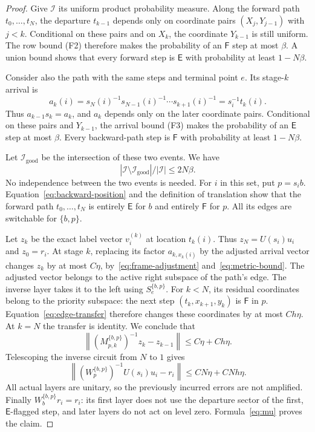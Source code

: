 \documentclass[11pt]{article}
\numberwithin{equation}{section}
\theoremstyle{definition}
\theoremstyle{remark}
\newcommand{\norm}[1]{\left\lVert#1\right\rVert}
\newcommand{\abs}[1]{\left\lvert#1\right\rvert}
\newcommand{\E}{\mathsf E}
\newcommand{\F}{\mathsf F}
\newcommand{\cI}{\mathcal I}
\begin{document}
\begin{proof}
Give $\cI$ its uniform product probability measure. Along the forward
path $t_0,\ldots,t_N$, the departure $t_{k-1}$ depends only on coordinate
pairs $(X_j,Y_{j-1})$ with $j<k$. Conditional on these pairs and on $X_k$,
the coordinate $Y_{k-1}$ is still uniform. The row bound (F2) therefore
makes the probability of an $\F$ step at most $\beta$. A union bound shows
that every forward step is $\E$ with probability at least $1-N\beta$.

Consider also the path with the same steps and terminal point $e$. Its
stage-$k$ arrival is
\begin{equation}\label{eq:backward-position}
 a_k(i)=s_N(i)^{-1}s_{N-1}(i)^{-1}\cdots s_{k+1}(i)^{-1}
       =s_i^{-1}t_k(i).
\end{equation}
Thus $a_{k-1}s_k=a_k$, and $a_k$ depends only on the later coordinate pairs.
Conditional on these pairs and $Y_{k-1}$, the arrival bound (F3) makes the
probability of an $\E$ step at most $\beta$. Every backward-path step is
$\F$ with probability at least $1-N\beta$.

Let $\cI_{\mathrm{good}}$ be the intersection of these two events. We have
\begin{equation}\label{eq:good-fraction}
 \abs{\cI\setminus\cI_{\mathrm{good}}}/\abs{\cI}\le2N\beta.
\end{equation}
No independence between the two events is needed. For $i$ in this set,
put $p=s_i b$. Equation~\eqref{eq:backward-position} and the definition
of translation show that the forward path $t_0,\ldots,t_N$ is entirely
$\E$ for $b$ and entirely $\F$ for $p$. All its edges are switchable for
$\{b,p\}$.

Let $z_k$ be the exact label vector $v_i^{(k)}$ at location $t_k(i)$.
Thus $z_N=U(s_i)u_i$ and $z_0=r_i$. At stage $k$, replacing its factor
$a_{k,x_k(i)}$ by the adjusted arrival vector changes $z_k$ by at most
$C\eta$, by~\eqref{eq:frame-adjustment} and~\eqref{eq:metric-bound}.
The adjusted vector belongs to the active right subspace of the path's
edge. The inverse layer takes it to the left using $S_e^{\{b,p\}}$.
For $k<N$, its residual coordinates belong to the priority subspace:
the next step $(t_k,x_{k+1},y_k)$ is $\F$ in $p$.
Equation~\eqref{eq:edge-transfer} therefore changes these coordinates by
at most $Ch\eta$. At $k=N$ the transfer is identity. We conclude that
\[
 \norm{(M_{p,k}^{\{b,p\}})^{-1}z_k-z_{k-1}}
 \le C\eta+Ch\eta.
\]
Telescoping the inverse circuit from $N$ to $1$ gives
\[
 \norm{(W_p^{\{b,p\}})^{-1}U(s_i)u_i-r_i}
 \le CN\eta+CNh\eta.
\]
All actual layers are unitary, so the previously incurred errors are not
amplified. Finally $W_b^{\{b,p\}}r_i=r_i$: its first layer does not use
the departure sector of the first, $\E$-flagged step, and later layers
do not act on level zero. Formula~\eqref{eq:mu} proves the claim.
\end{proof}
\end{document}
